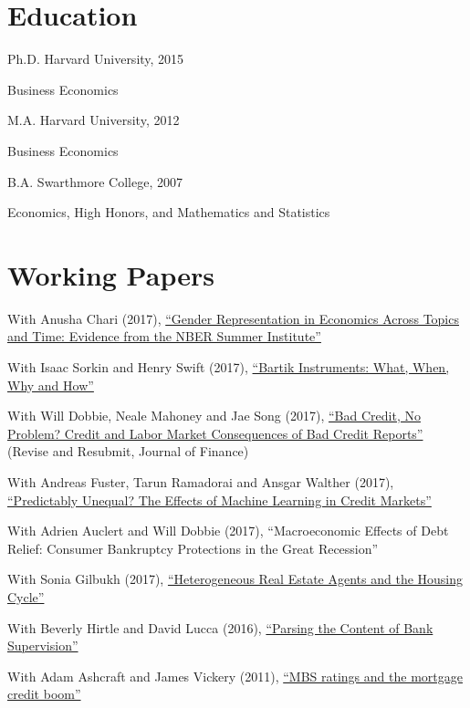 \documentclass[letterpaper]{article}
\renewenvironment{itemize}{
  \begin{list}{}
    { \setlength{\itemsep}{5pt}
      \setlength{\parsep}{0pt}
      \setlength{\topsep}{0pt}
      \setlength{\leftmargin}{0em} } }{
  \end{list}}
\begin{document}
\section*{Education}

\begin{itemize}
\item Ph.D. Harvard University, 2015
  \begin{itemize}
  \item Business Economics
  \end{itemize}
\item M.A. Harvard University, 2012
  \begin{itemize}
  \item Business Economics
  \end{itemize}
\item B.A. Swarthmore College, 2007
  \begin{itemize}
  \item Economics, High Honors, and Mathematics and Statistics
  \end{itemize}
\end{itemize}

\section*{Working Papers}

\begin{itemize}
\item With Anusha Chari (2017), \href{http://paulgp.github.io/papers/cgp_nbergender.pdf}{``Gender Representation in Economics Across Topics and Time: Evidence from the NBER Summer Institute''} 
\item With Isaac Sorkin and Henry Swift (2017), \href{http://paulgp.github.io/papers/bartik_gpss.pdf}{``Bartik Instruments: What, When, Why and How''}
\item With Will Dobbie, Neale Mahoney and Jae Song (2017), \href{https://papers.ssrn.com/sol3/papers.cfm?abstract_id=2844316}{``Bad Credit, No Problem? Credit and Labor Market Consequences of Bad Credit Reports''} (Revise and Resubmit, Journal of Finance)
\item With Andreas Fuster, Tarun Ramadorai and Ansgar Walther (2017), \href{http://paulgp.github.io/papers/MLCreditPaper.pdf}{``Predictably Unequal? The Effects of Machine Learning in Credit Markets''}
\item With Adrien Auclert and Will Dobbie (2017), ``Macroeconomic Effects of Debt Relief: Consumer Bankruptcy Protections in the Great Recession''
\item With Sonia Gilbukh (2017), \href{https://www.dropbox.com/s/ky87ydinuq2pj7g/Agents_v1.pdf?dl=0}{``Heterogeneous Real Estate Agents and the Housing Cycle''}
\item With Beverly Hirtle and David Lucca (2016), \href{https://www.newyorkfed.org/research/staff_reports/sr770.html}{``Parsing the Content of Bank Supervision''}
\item With Adam Ashcraft and James Vickery (2011), \href{http://papers.ssrn.com/sol3/papers.cfm?abstract_id=1615613}{``MBS ratings and the mortgage credit boom''}
\end{itemize}
\end{document}
